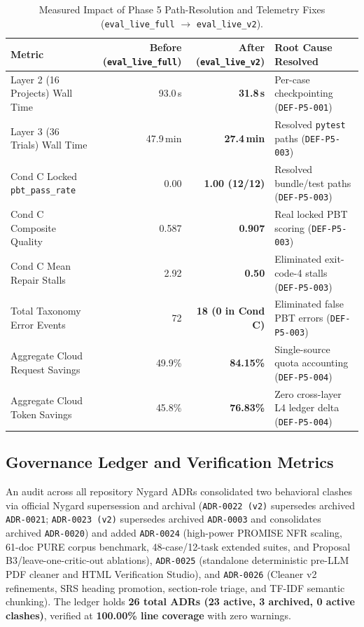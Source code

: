 \documentclass[11pt,a4paper]{article}
\begin{document}
\begin{table}[htbp]
\centering
\caption{Measured Impact of Phase 5 Path-Resolution and Telemetry Fixes (\texttt{eval\_live\_full} $\rightarrow$ \texttt{eval\_live\_v2}).}
\label{tab:before_after}
\small
\begin{tabular}{lrrl}
\toprule
\textbf{Metric} & \textbf{Before (\texttt{eval\_live\_full})} & \textbf{After (\texttt{eval\_live\_v2})} & \textbf{Root Cause Resolved} \\
\midrule
Layer 2 (16 Projects) Wall Time & 93.0\,s & \textbf{31.8\,s} & Per-case checkpointing (\texttt{DEF-P5-001}) \\
Layer 3 (36 Trials) Wall Time & 47.9\,min & \textbf{27.4\,min} & Resolved \texttt{pytest} paths (\texttt{DEF-P5-003}) \\
Cond C Locked \texttt{pbt\_pass\_rate} & 0.00 & \textbf{1.00 (12/12)} & Resolved bundle/test paths (\texttt{DEF-P5-003}) \\
Cond C Composite Quality & 0.587 & \textbf{0.907} & Real locked PBT scoring (\texttt{DEF-P5-003}) \\
Cond C Mean Repair Stalls & 2.92 & \textbf{0.50} & Eliminated exit-code-4 stalls (\texttt{DEF-P5-003}) \\
Total Taxonomy Error Events & 72 & \textbf{18 (0 in Cond C)} & Eliminated false PBT errors (\texttt{DEF-P5-003}) \\
Aggregate Cloud Request Savings & 49.9\% & \textbf{84.15\%} & Single-source quota accounting (\texttt{DEF-P5-004}) \\
Aggregate Cloud Token Savings & 45.8\% & \textbf{76.83\%} & Zero cross-layer L4 ledger delta (\texttt{DEF-P5-004}) \\
\bottomrule
\end{tabular}
\end{table}

\subsection{Governance Ledger and Verification Metrics}
An audit across all repository Nygard ADRs consolidated two behavioral clashes via official Nygard supersession and archival (\texttt{ADR-0022 (v2)} supersedes archived \texttt{ADR-0021}; \texttt{ADR-0023 (v2)} supersedes archived \texttt{ADR-0003} and consolidates archived \texttt{ADR-0020}) and added \texttt{ADR-0024} (high-power PROMISE NFR scaling, 61-doc PURE corpus benchmark, 48-case/12-task extended suites, and Proposal B3/leave-one-critic-out ablations), \texttt{ADR-0025} (standalone deterministic pre-LLM PDF cleaner and HTML Verification Studio), and \texttt{ADR-0026} (Cleaner v2 refinements, SRS heading promotion, section-role triage, and TF-IDF semantic chunking). The ledger holds \textbf{26 total ADRs (23 active, 3 archived, 0 active clashes)}, verified at \textbf{100.00\% line coverage} with zero warnings.
\end{document}
